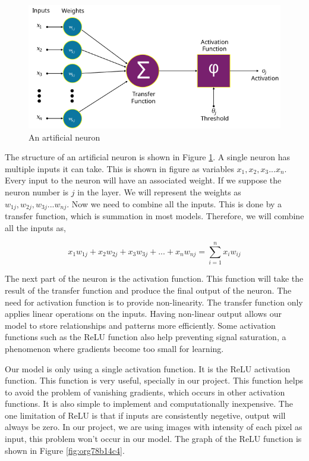 \documentclass[a4paper,oneside,12pt]{report}
\begin{document}
\begin{figure}[htbp]
\centering
\includegraphics[width=.9\linewidth]{Neural_Network/2025-04-26_00-32-11_640px-Artificial_neuron_structure.svg.png}
\caption{\label{fig:orgde4f6ad}An artificial neuron}
\end{figure}

The structure of an artificial neuron is shown in Figure \ref{fig:orgde4f6ad}. A single neuron has multiple inputs it can take. This is shown in figure as variables \(x_1, x_2, x_3 ... x_n\). Every input to the neuron will have an associated weight. If we suppose the neuron number is \(j\) in the layer. We will represent the weights as \(w_{1j}, w_{2j}, w_{3j} ... w_{nj}\). Now we need to combine all the inputs. This is done by a transfer function, which is
summation in most models. Therefore, we will combine all the inputs as,

\[ x_1 w_{1j} + x_2 w_{2j} + x_3 w_{3j} + ... + x_n w_{nj} = \sum_{i=1}^{n} x_i w_{ij}\]

The next part of the neuron is the activation function. This function will take the result of the transfer function and produce the final output of the neuron. The need for activation function is to provide non-linearity. The transfer function only applies linear operations on the inputs. Having non-linear output allows our model to store relationships and patterns more efficiently. Some activation functions such as the ReLU function also help preventing signal saturation, a phenomenon where gradients become too small for learning.

Our model is only using a single activation function. It is the ReLU activation function. This function is very useful, specially in our project. This function helps to avoid the problem of vanishing gradients, which occurs in other activation functions. It is also simple to implement and computationally inexpensive. The one limitation of ReLU is that if inputs are consistently negetive, output will always be zero. In our project, we are using images with intensity of each pixel as input, this problem won't occur in our model. The graph of the ReLU function is shown in Figure \ref{fig:org78b14c4}.
\end{document}
